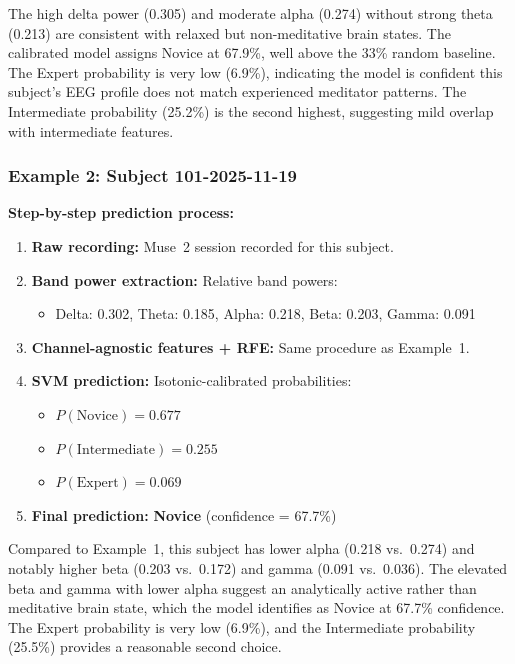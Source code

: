 \documentclass[12pt,a4paper]{article}
\begin{document}
The high delta power (0.305) and moderate alpha (0.274) without strong theta (0.213) are consistent with relaxed but non-meditative brain states. The calibrated model assigns Novice at 67.9\%, well above the 33\% random baseline. The Expert probability is very low (6.9\%), indicating the model is confident this subject's EEG profile does not match experienced meditator patterns. The Intermediate probability (25.2\%) is the second highest, suggesting mild overlap with intermediate features.

\subsubsection{Example 2: Subject 101-2025-11-19}

\textbf{Step-by-step prediction process:}

\begin{enumerate}
  \item \textbf{Raw recording:} Muse~2 session recorded for this subject.
  \item \textbf{Band power extraction:} Relative band powers:
  \begin{itemize}
    \item Delta: 0.302, Theta: 0.185, Alpha: 0.218, Beta: 0.203, Gamma: 0.091
  \end{itemize}
  \item \textbf{Channel-agnostic features + RFE:} Same procedure as Example~1.
  \item \textbf{SVM prediction:} Isotonic-calibrated probabilities:
  \begin{itemize}
    \item $P(\text{Novice}) = 0.677$
    \item $P(\text{Intermediate}) = 0.255$
    \item $P(\text{Expert}) = 0.069$
  \end{itemize}
  \item \textbf{Final prediction:} \textbf{Novice} (confidence = 67.7\%)
\end{enumerate}

Compared to Example~1, this subject has lower alpha (0.218 vs.\ 0.274) and notably higher beta (0.203 vs.\ 0.172) and gamma (0.091 vs.\ 0.036). The elevated beta and gamma with lower alpha suggest an analytically active rather than meditative brain state, which the model identifies as Novice at 67.7\% confidence. The Expert probability is very low (6.9\%), and the Intermediate probability (25.5\%) provides a reasonable second choice.
\end{document}
